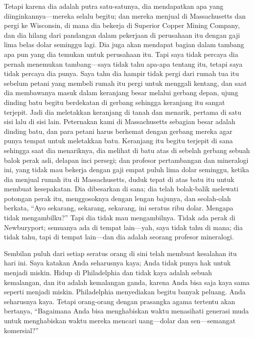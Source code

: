 \documentclass[
  letterpaper,
  DIV=11,
  numbers=noendperiod]{scrreprt}
\begin{document}
Tetapi karena dia adalah putra satu-satunya, dia mendapatkan apa yang
diinginkannya---mereka selalu begitu; dan mereka menjual di
Massachusetts dan pergi ke Wisconsin, di mana dia bekerja di Superior
Copper Mining Company, dan dia hilang dari pandangan dalam pekerjaan di
perusahaan itu dengan gaji lima belas dolar seminggu lagi. Dia juga akan
mendapat bagian dalam tambang apa pun yang dia temukan untuk perusahaan
itu. Tapi saya tidak percaya dia pernah menemukan tambang---saya tidak
tahu apa-apa tentang itu, tetapi saya tidak percaya dia punya. Saya tahu
dia hampir tidak pergi dari rumah tua itu sebelum petani yang membeli
rumah itu pergi untuk menggali kentang, dan saat dia membawanya masuk
dalam keranjang besar melalui gerbang depan, ujung dinding batu begitu
berdekatan di gerbang sehingga keranjang itu sangat terjepit. Jadi dia
meletakkan keranjang di tanah dan menarik, pertama di satu sisi lalu di
sisi lain. Peternakan kami di Massachusetts sebagian besar adalah
dinding batu, dan para petani harus berhemat dengan gerbang mereka agar
punya tempat untuk meletakkan batu. Keranjang itu begitu terjepit di
sana sehingga saat dia menariknya, dia melihat di batu atas di sebelah
gerbang sebuah balok perak asli, delapan inci persegi; dan profesor
pertambangan dan mineralogi ini, yang tidak mau bekerja dengan gaji
empat puluh lima dolar seminggu, ketika dia menjual rumah itu di
Massachusetts, duduk tepat di atas batu itu untuk membuat kesepakatan.
Dia dibesarkan di sana; dia telah bolak-balik melewati potongan perak
itu, menggosoknya dengan lengan bajunya, dan seolah-olah berkata, ``Ayo
sekarang, sekarang, sekarang, ini seratus ribu dolar. Mengapa tidak
mengambilku?'' Tapi dia tidak mau mengambilnya. Tidak ada perak di
Newburyport; semuanya ada di tempat lain---yah, saya tidak tahu di mana;
dia tidak tahu, tapi di tempat lain---dan dia adalah seorang profesor
mineralogi.

Sembilan puluh dari setiap seratus orang di sini telah membuat kesalahan
itu hari ini. Saya katakan Anda seharusnya kaya; Anda tidak punya hak
untuk menjadi miskin. Hidup di Philadelphia dan tidak kaya adalah sebuah
kemalangan, dan itu adalah kemalangan ganda, karena Anda bisa saja kaya
sama seperti menjadi miskin. Philadelphia menyediakan begitu banyak
peluang. Anda seharusnya kaya. Tetapi orang-orang dengan prasangka agama
tertentu akan bertanya, ``Bagaimana Anda bisa menghabiskan waktu
menasihati generasi muda untuk menghabiskan waktu mereka mencari
uang---dolar dan sen---semangat komersial?''
\end{document}
